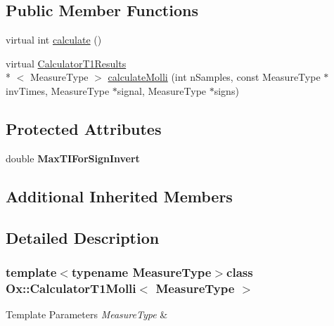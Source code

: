 \subsection*{Public Member Functions}
\begin{DoxyCompactItemize}
\item 
virtual int \hyperlink{class_ox_1_1_calculator_t1_molli_ad6b1b36c0e06df8b1b05b06b4c1f10f1}{calculate} ()
\item 
virtual \hyperlink{struct_ox_1_1_calculator_t1_results}{Calculator\-T1\-Results}\\*
$<$ Measure\-Type $>$ \hyperlink{class_ox_1_1_calculator_t1_molli_aff65007fe06dbce9449fc42aead8a6bd}{calculate\-Molli} (int n\-Samples, const Measure\-Type $\ast$inv\-Times, Measure\-Type $\ast$signal, Measure\-Type $\ast$signs)
\end{DoxyCompactItemize}
\subsection*{Protected Attributes}
\begin{DoxyCompactItemize}
\item 
\hypertarget{class_ox_1_1_calculator_t1_molli_adb4f50cdf9dabf4890b4d28194d0522b}{double {\bfseries Max\-T\-I\-For\-Sign\-Invert}}\label{class_ox_1_1_calculator_t1_molli_adb4f50cdf9dabf4890b4d28194d0522b}

\end{DoxyCompactItemize}
\subsection*{Additional Inherited Members}


\subsection{Detailed Description}
\subsubsection*{template$<$typename Measure\-Type$>$class Ox\-::\-Calculator\-T1\-Molli$<$ Measure\-Type $>$}


\begin{DoxyTemplParams}{Template Parameters}
{\em Measure\-Type} & \\
\hline
\end{DoxyTemplParams}


